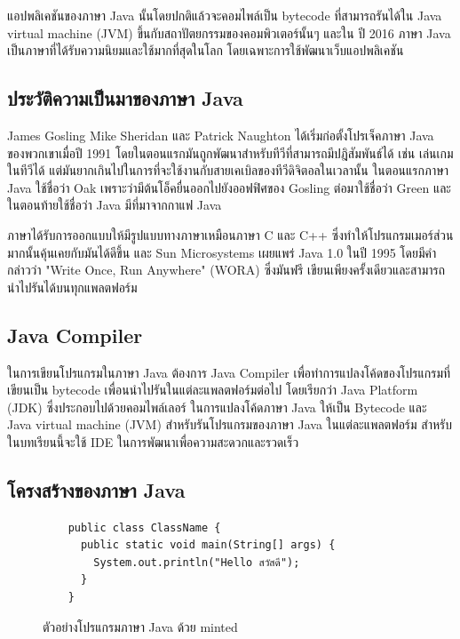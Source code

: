 แอปพลิเคชันของภาษา Java นั้นโดยปกติแล้วจะคอมไพล์เป็น bytecode ที่สามารถรันได้ใน Java virtual machine (JVM) ขึ้นกับสถาปัตยกรรมของคอมพิวเตอร์นั้นๆ และใน ปี 2016 ภาษา Java เป็นภาษาที่ได้รับความนิยมและใช้มากที่สุดในโลก โดยเฉพาะการใช้พัฒนาเว็บแอปพลิเคชัน

	\subsection{ประวัติความเป็นมาของภาษา Java}
	James Gosling Mike Sheridan และ Patrick Naughton ได้เริ่มก่อตั้งโปรเจ็คภาษา Java ของพวกเขาเมื่อปี 1991 โดยในตอนแรกมันถูกพัฒนาสำหรับทีวีที่สามารถมีปฎิสัมพันธ์ได้ เช่น เล่นเกมในทีวีได้ แต่มันยากเกินไปในการที่จะใช้งานกับสายเคเบิลของทีวีดิจิตอลในเวลานั้น ในตอนแรกภาษา Java ใช้ชื่อว่า Oak เพราะว่ามีต้นโอ็คยื่นออกไปยังออฟฟิศของ Gosling ต่อมาใช้ชื่อว่า Green และในตอนท้ายใช้ชื่อว่า Java มีที่มาจากกาแฟ Java 
	
	ภาษาได้รับการออกแบบให้มีรูปแบบทางภาษาเหมือนภาษา C และ C++ ซึ่งทำให้โปรแกรมเมอร์ส่วนมากนั้นคุ้นเคยกับมันได้ดีขึ้น และ Sun Microsystems เผยแพร่ Java 1.0 ในปี 1995 โดยมีคำกล่าวว่า "Write Once, Run Anywhere" (WORA) ซึ่งมันฟรี เขียนเพียงครั้งเดียวและสามารถนำไปรันได้บนทุกแพลตฟอร์ม
	
	\subsection{Java Compiler}
	ในการเขียนโปรแกรมในภาษา Java ต้องการ Java Compiler เพื่อทำการแปลงโค้ดของโปรแกรมที่เขียนเป็น bytecode เพื่อนนำไปรันในแต่ละแพลตฟอร์มต่อไป โดยเรียกว่า Java Platform (JDK) ซึ่งประกอบไปด้วยคอมไพล์เลอร์ ในการแปลงโค้ดภาษา Java ให้เป็น Bytecode และ Java virtual machine (JVM) สำหรับรันโปรแกรมของภาษา Java ในแต่ละแพลตฟอร์ม สำหรับในบทเรียนนี้จะใช้ IDE ในการพัฒนาเพื่อความสะดวกและรวดเร็ว
	
	\subsection{โครงสร้างของภาษา Java}

  \begin{figure}[H]
    \begin{verbatim}
    public class ClassName {
      public static void main(String[] args) {
        System.out.println("Hello สวัสดี");
      }
    }
    \end{verbatim}
    \caption{ตัวอย่างโปรแกรมภาษา Java ด้วย minted}
    \label{Fig:JavaClassMinted}
  \end{figure}
  
